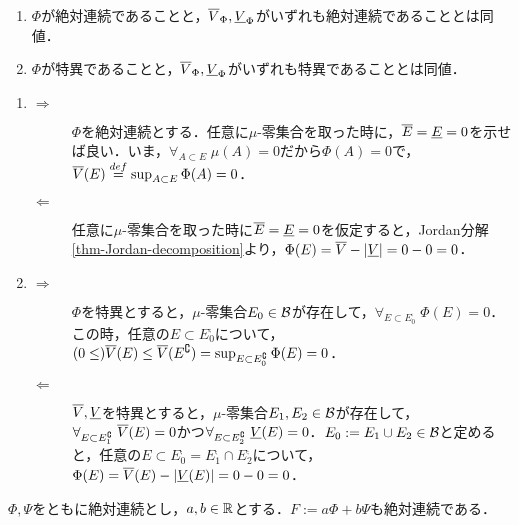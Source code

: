 \documentclass[uplatex, dvipdfmx]{jsreport}
\begin{document}
\begin{theorem}\mbox{}
    \begin{enumerate}
        \item $\Phi$が絶対連続であることと，$\overline{V}_\Phi,\underline{V}_\Phi$がいずれも絶対連続であることとは同値．
        \item $\Phi$が特異であることと，$\overline{V}_\Phi,\underline{V}_\Phi$がいずれも特異であることとは同値．
    \end{enumerate}
\end{theorem}
\begin{Proof}\mbox{}
    \begin{enumerate}
        \item \begin{description}
            \item[$\Rightarrow$] $\Phi$を絶対連続とする．任意に$\mu$-零集合を取った時に，$\overline{E}=\underline{E}=0$を示せば良い．いま，$\forall_{A\subset E}\;\mu(A)=0$だから$\Phi(A)=0$で，$\overline{V}(E)\overset{def}{=}\sup_{A\subset E}\Phi(A)=0$．
            \item[$\Leftarrow$] 任意に$\mu$-零集合を取った時に$\overline{E}=\underline{E}=0$を仮定すると，Jordan分解\ref{thm-Jordan-decomposition}より，$\Phi(E)=\overline{V}-\lvert\underline{V}\rvert=0-0=0$．
        \end{description}
        \item \begin{description}
            \item[$\Rightarrow$] $\Phi$を特異とすると，$\mu$-零集合$E_0\in\mathcal{B}$が存在して，$\forall_{E\subset E_0^\comp}\;\Phi(E)=0$．この時，任意の$E\subset E_0^\comp$について，$(0\le)\overline{V}(E)\le\overline{V}(E^\complement)=\sup_{E\subset E_0^\complement}\Phi(E)=0$．
            \item[$\Leftarrow$] $\overline{V},\underline{V}$を特異とすると，$\mu$-零集合$E_1,E_2\in\mathcal{B}$が存在して，$\forall_{E\subset E_1^\complement}\;\overline{V}(E)=0$かつ$\forall_{E\subset E_2^\complement}\;\underline{V}(E)=0$．$E_0:=E_1\cup E_2\in\mathcal{B}$と定めると，任意の$E\subset E_0^\comp=E_1^\comp\cap E_2^\comp$について，$\Phi(E)=\overline{V}(E)-\lvert\underline{V}(E)\rvert=0-0=0$．
        \end{description}
    \end{enumerate}
\end{Proof}
\begin{corollary}\label{cor-linearity-of-continuousness}
    $\Phi,\Psi$をともに絶対連続とし，$a,b\in\mathbb{R}$とする．$F:=a\Phi+b\Psi$も絶対連続である．
\end{corollary}
\end{document}
